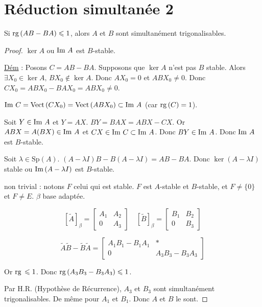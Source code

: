 \section*{Réduction simultanée 2}

Si $\operatorname{rg} \,(AB - BA) \leqslant 1$, alors $A$ et $B$ sont simultanément trigonalisables.

\begin{proof}
     $\ker A$ ou $\operatorname{Im} \, A$ est $B$-stable.
    
    \uline{Dém} : Posons $C = AB - BA$. Supposons que $\ker A$ n'est pas $B$ stable.
    Alors $\exists X_0 \in \ker A, \, B X_0 \notin \ker A$.
    Donc $A X_0 = 0$ et $A B X_0 \neq 0$.
    Donc $C X_0 = A B X_0 - B A X_0 = A B X_0 \neq 0$.
    
    $\operatorname{Im} \, C = \operatorname{Vect} \,(C X_0) = \operatorname{Vect} \,(A B X_0) \subset \operatorname{Im} \, A$ (car $\operatorname{rg} \,(C) = 1$).
    
    Soit $Y \in \operatorname{Im} \, A$ et $Y = A X$.
    $B Y = B A X = A B X - C X$.
    Or $A B X = A(BX) \in \operatorname{Im} \, A$ et $C X \in \operatorname{Im} \, C \subset \operatorname{Im} \, A$.
    Donc $B Y \in \operatorname{Im} \, A$.
    Donc $\operatorname{Im} \, A$ est $B$-stable.

    \lvspace
     Soit $\lambda \in \text{Sp}(A)$. $(A - \lambda I) B - B (A - \lambda I) = AB - BA$.
    Donc $\ker(A - \lambda I)$ stable ou $\operatorname{Im} \,(A - \lambda I)$ est $B$-stable.
    
    non trivial : notons $F$ celui qui est stable.
    $F$ est $A$-stable et $B$-stable, et $F \neq \{0\}$ et $F \neq E$.
    $\beta$ base adaptée.
    
    \[ [\tilde A]_\beta = \left[ \begin{array}{c|c} A_1 & A_2 \\ \hline 0 & A_3 \end{array} \right] \quad [\tilde B]_\beta = \left[ \begin{array}{c|c} B_1 & B_2 \\ \hline 0 & B_3 \end{array} \right] \]
    
    \[ \tilde A \tilde B - \tilde B \tilde A = \left[ \begin{array}{c|c} A_1 B_1 - B_1 A_1 & * \\ \hline 0 & A_3 B_3 - B_3 A_3 \end{array} \right] \]
    
    Or $\operatorname{rg} \, \leqslant 1$.
    Donc $\operatorname{rg} \,(A_3 B_3 - B_3 A_3) \leqslant 1$.
    
    Par H.R. (Hypothèse de Récurrence), $A_3$ et $B_3$ sont simultanément trigonalisables.
    De même pour $A_1$ et $B_1$.
    Donc $A$ et $B$ le sont.
\end{proof}

